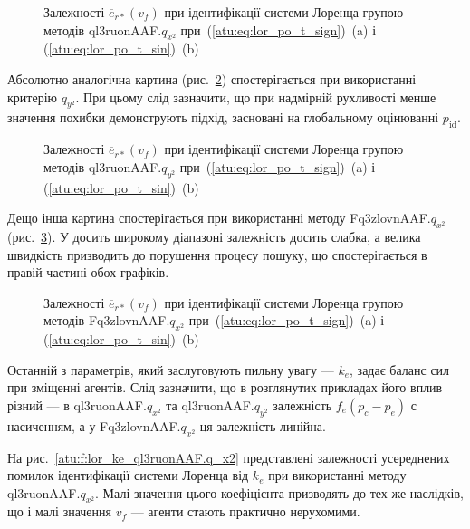 \begin{figure}[htb!]
  \caption{Залежності $ \overline{e}_{r *} (v_f) $ при ідентифікації системи Лоренца групою методів ql3ruonAAF.$q_{x^2} $ при~(\ref{atu:eq:lor_po_t_sign})~(a) і (\ref{atu:eq:lor_po_t_sin})~(b)}
  \label{atu:f:lor_vf_ql3ruonAAF.q_x2}
\end{figure}

Абсолютно аналогічна картина (рис.~\ref{atu:f:lor_vf_ql3ruonAAF.q_y2})
спостерігається при використанні критерію
$q_{y^2}$.
При цьому слід зазначити, що при надмірній рухливості менше
значення похибки демонструють підхід, засновані на глобальному
оцінюванні
$p_\mathrm{id} $.


\begin{figure}[htb!]
  \caption{Залежності $\overline{e}_{r *} (v_f) $ при ідентифікації системи Лоренца групою методів ql3ruonAAF.$q_{y^2} $ при~(\ref{atu:eq:lor_po_t_sign})~(a) і (\ref{atu:eq:lor_po_t_sin})~(b)}
  \label{atu:f:lor_vf_ql3ruonAAF.q_y2}
\end{figure}

Дещо інша картина спостерігається при використанні методу
Fq3zlovnAAF.$q_{x^2}$
(рис.~\ref{atu:f:lor_vf_Fq3zlovnAAF.q_x2}).
У досить широкому діапазоні залежність досить слабка, а
велика швидкість призводить до порушення процесу пошуку, що
спостерігається в правій частині обох графіків.

\begin{figure}[htb!]
  \caption{Залежності $ \overline{e}_{r *} (v_f) $ при ідентифікації системи Лоренца групою методів Fq3zlovnAAF.$q_{x^2} $ при~(\ref{atu:eq:lor_po_t_sign})~(a) і (\ref{atu:eq:lor_po_t_sin})~(b)}
  \label{atu:f:lor_vf_Fq3zlovnAAF.q_x2}
\end{figure}

Останній з параметрів, який заслуговують пильну увагу ---
$k_e $, задає баланс сил при зміщенні агентів. Слід
зазначити, що в розглянутих прикладах його вплив різний ---
в ql3ruonAAF.$q_{x^2}$ та ql3ruonAAF.$q_{y^2}$
залежність $f_e(p_c-p_e)$ с насиченням,
а у Fq3zlovnAAF.$q_{x^2}$ ця залежність линійна.

На рис.~\ref{atu:f:lor_ke_ql3ruonAAF.q_x2} представлені залежності усереднених
помилок ідентифікації системи Лоренца від
$k_e$ при використанні методу ql3ruonAAF.$q_{x^2} $. Малі значення цього коефіцієнта призводять до тех же
наслідків, що і малі значення $ v_f $ --- агенти стають практично нерухомими.


